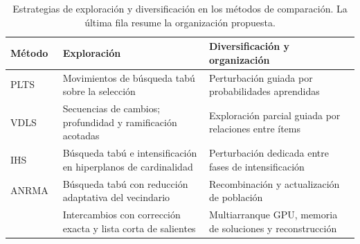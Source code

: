 \begin{table}[tbp]
\centering\small
\setlength{\tabcolsep}{4pt}
\raggedright
\renewcommand{\arraystretch}{1.15}

\caption{Estrategias de exploración y diversificación en los métodos de comparación. La última fila resume la organización propuesta.}
\label{tab:method-context}
\begin{tabular}{p{.16\linewidth}p{.35\linewidth}p{.38\linewidth}}
\toprule
Método & Exploración & Diversificación y organización\\
\midrule
PLTS~\cite{Li2021PLTS} & Movimientos de búsqueda tabú sobre la selección & Perturbación guiada por probabilidades aprendidas\\
VDLS~\cite{Zhou2022VDLS} & Secuencias de cambios; profundidad y ramificación acotadas & Exploración parcial guiada por relaciones entre ítems\\
IHS~\cite{Wei2023IHS} & Búsqueda tabú e intensificación en hiperplanos de cardinalidad & Perturbación dedicada entre fases de intensificación\\
ANRMA~\cite{Wei2026ANRMA} & Búsqueda tabú con reducción adaptativa del vecindario & Recombinación y actualización de población\\
\method{} & Intercambios con corrección exacta y lista corta de salientes & Multiarranque GPU, memoria de soluciones y reconstrucción\\
\bottomrule
\end{tabular}

\end{table}
